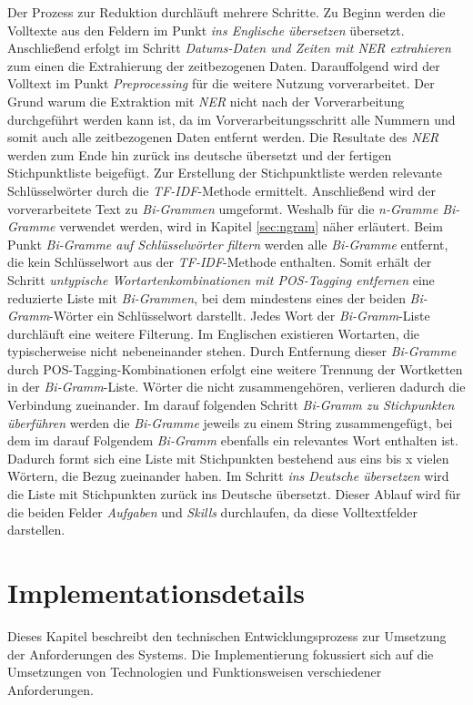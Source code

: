 Der Prozess zur Reduktion durchläuft mehrere Schritte. Zu Beginn werden die Volltexte aus den Feldern im Punkt \emph{ins Englische übersetzen} übersetzt. Anschließend erfolgt im Schritt \emph{Datums-Daten und Zeiten mit NER extrahieren} zum einen die Extrahierung der zeitbezogenen Daten. Darauffolgend wird der Volltext im Punkt \emph{Preprocessing} für die weitere Nutzung vorverarbeitet. Der Grund warum die Extraktion mit \emph{NER} nicht nach der Vorverarbeitung durchgeführt werden kann ist, da im Vorverarbeitungsschritt alle Nummern und somit auch alle zeitbezogenen Daten entfernt werden. Die Resultate des \emph{NER} werden zum Ende hin zurück ins deutsche übersetzt und der fertigen Stichpunktliste beigefügt. Zur Erstellung der Stichpunktliste werden relevante Schlüsselwörter durch die \emph{TF-IDF}-Methode ermittelt. Anschließend wird der vorverarbeitete Text zu \emph{Bi-Grammen} umgeformt. Weshalb für die \emph{n-Gramme} \emph{Bi-Gramme} verwendet werden, wird in Kapitel \ref{sec:ngram} näher erläutert. Beim Punkt \emph{Bi-Gramme auf Schlüsselwörter filtern} werden alle \emph{Bi-Gramme} entfernt, die kein Schlüsselwort aus der \emph{TF-IDF}-Methode enthalten. Somit erhält der Schritt \emph{untypische Wortartenkombinationen mit POS-Tagging entfernen} eine reduzierte Liste mit \emph{Bi-Grammen}, bei dem mindestens eines der beiden \emph{Bi-Gramm}-Wörter ein Schlüsselwort darstellt. Jedes Wort der \emph{Bi-Gramm}-Liste durchläuft eine weitere Filterung. Im Englischen existieren Wortarten, die typischerweise nicht nebeneinander stehen. Durch Entfernung dieser \emph{Bi-Gramme} durch POS-Tagging-Kombinationen erfolgt eine weitere Trennung der Wortketten in der \emph{Bi-Gramm}-Liste. Wörter die nicht zusammengehören, verlieren dadurch die Verbindung zueinander. Im darauf folgenden Schritt \emph{Bi-Gramm zu Stichpunkten überführen} werden die \emph{Bi-Gramme} jeweils zu einem String zusammengefügt, bei dem im darauf Folgendem \emph{Bi-Gramm} ebenfalls ein relevantes Wort enthalten ist. Dadurch formt sich eine Liste mit Stichpunkten bestehend aus eins bis x vielen Wörtern, die Bezug zueinander haben. Im Schritt \emph{ins Deutsche übersetzen} wird die Liste mit Stichpunkten zurück ins Deutsche übersetzt. Dieser Ablauf wird für die beiden Felder \emph{Aufgaben} und \emph{Skills} durchlaufen, da diese Volltextfelder darstellen.
\section{Implementationsdetails}
Dieses Kapitel beschreibt den technischen Entwicklungsprozess zur Umsetzung der Anforderungen des Systems. Die Implementierung fokussiert sich auf die Umsetzungen von Technologien und Funktionsweisen verschiedener Anforderungen. %
